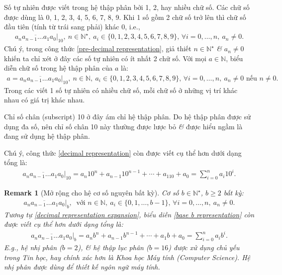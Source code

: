 \documentclass[oneside]{book}
\numberwithin{equation}{section}
\newtheorem{remark}{Remark}[section]
\begin{document}
Số tự nhiên được viết trong hệ thập phân bởi 1, 2, hay nhiều chữ số. Các chữ số được dùng là 0, 1, 2, 3, 4, 5, 6, 7, 8, 9. Khi 1 số gồm 2 chữ số trở lên thì chữ số đầu tiên (tính từ trái sang phải) khác 0, i.e.,
\begin{align}
	\label{pre-decimal representation}
	\overline{a_na_{n-1}\ldots a_1a_0}|_{10},\ n\in\mathbb{N}^\star,\ a_i\in\{0,1,2,3,4,5,6,7,8,9\},\,\forall i = 0,\ldots,n,\ a_n\ne 0.
\end{align}
Chú ý, trong công thức \eqref{pre-decimal representation}, giả thiết $n\in\mathbb{N}^\star$ \textit{\&} $a_n\ne 0$ khiến ta chỉ xét ở đây các số tự nhiên có ít nhất 2 chữ số. Với mọi $a\in\mathbb{N}$, biểu diễn chữ số trong hệ thập phân của $a$ là:
\begin{align}
	\label{decimal representation}
	a = \overline{a_na_{n-1}\ldots a_1a_0}|_{10},\ n\in\mathbb{N},\ a_i\in\{0,1,2,3,4,5,6,7,8,9\},\,\forall i = 0,\ldots,n,\ a_n\ne 0\mbox{ nếu } n\ne 0.
\end{align}
Trong các viết 1 số tự nhiên có nhiều chữ số, mỗi chữ số ở những vị trí khác nhau có giá trị khác nhau.

Chỉ số chân (subscript) 10 ở đây ám chỉ hệ thập phân. Do hệ thập phân được sử dụng đa số, nên chỉ số chân 10 này thường được lược bỏ \textit{\&} được hiểu ngầm là đang sử dụng hệ thập phân.

Chú ý, công thức \eqref{decimal representation} còn được viết cụ thể hơn dưới dạng tổng là:
\begin{align}
	\label{decimal representation expansion}
	\overline{a_na_{n-1}\ldots a_1a_0}|_{10} = a_n10^n + a_{n-1}10^{n-1} + \cdots + a_110 + a_0 = \sum_{i=0}^n a_i10^i.
\end{align}

\begin{remark}[Mở rộng cho hệ cơ số nguyên bất kỳ]
	Cơ số $b\in\mathbb{N}^\star$, $b\ge 2$ bất kỳ:
	\begin{align}
		\label{base b representation}
		\overline{a_na_{n-1}\ldots a_1a_0}|_{b},\ \mbox{ với } n\in\mathbb{N},\ a_i\in\{0,1,\ldots,b - 1\},\,\forall i = 0,\ldots,n,\ a_n\ne 0.
	\end{align}
	Tương tự \eqref{decimal representation expansion}, biểu diễn \eqref{base b representation} còn được viết cụ thể hơn dưới dạng tổng là:
	\begin{align}
		\label{base b representation expansion}
		\overline{a_na_{n-1}\ldots a_1a_0}|_{b} = a_nb^n + a_{n-1}b^{n-1} + \cdots + a_1b + a_0 = \sum_{i=0}^n a_ib^i.
	\end{align}
	E.g., hệ nhị phân ($b = 2$), \textit{\&} hệ thập lục phân ($b = 16$) được xử dụng chủ yếu trong Tin học, hay chính xác hơn là Khoa học Máy tính (Computer Science). Hệ nhị phân được dùng để thiết kế ngôn ngữ máy tính.
\end{remark}
\end{document}
